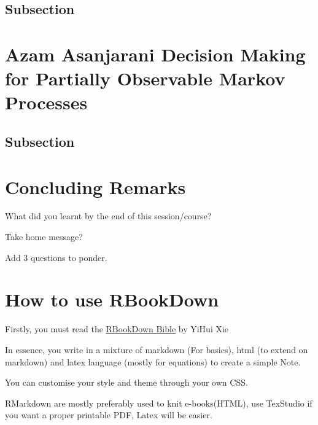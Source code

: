 \documentclass[
]{book}
\begin{document}
\hypertarget{subsection}{%
\section{Subsection}\label{subsection}}

\hypertarget{azam-asanjarani-decision-making-for-partially-observable-markov-processes}{%
\chapter*{Azam Asanjarani \textbar{} Decision Making for Partially Observable Markov Processes}\label{azam-asanjarani-decision-making-for-partially-observable-markov-processes}}

\hypertarget{subsection}{%
\section{Subsection}\label{subsection}}

\hypertarget{concluding-remarks}{%
\chapter*{Concluding Remarks}\label{concluding-remarks}}

What did you learnt by the end of this session/course?

Take home message?

Add 3 questions to ponder.

\hypertarget{how-to-use-rbookdown}{%
\chapter*{How to use RBookDown}\label{how-to-use-rbookdown}}

Firstly, you must read the \href{https://bookdown.org/yihui/bookdown/}{RBookDown Bible} by YiHui Xie

In essence, you write in a mixture of markdown (For basics), html (to extend on markdown) and latex language (mostly for equations) to create a simple Note.

You can customise your style and theme through your own CSS.

RMarkdown are mostly preferably used to knit e-books(HTML), use TexStudio if you want a proper printable PDF, Latex will be easier.
\end{document}
